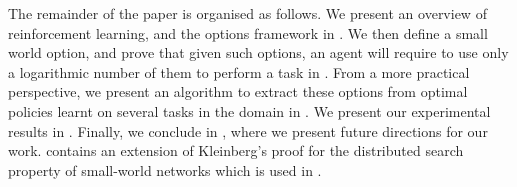  The remainder of the paper is organised as follows. We present an overview of reinforcement learning, and the options framework in . We then define a small world option, and prove that given such options, an agent will require to use only a logarithmic number of them to perform a task in . From a more practical perspective, we present an algorithm to extract these options from optimal policies learnt on several tasks in the domain in . We present our experimental results in . Finally, we conclude in , where we present future directions for our work.  contains an extension of Kleinberg's proof for the distributed search property of small-world networks which is used in .

